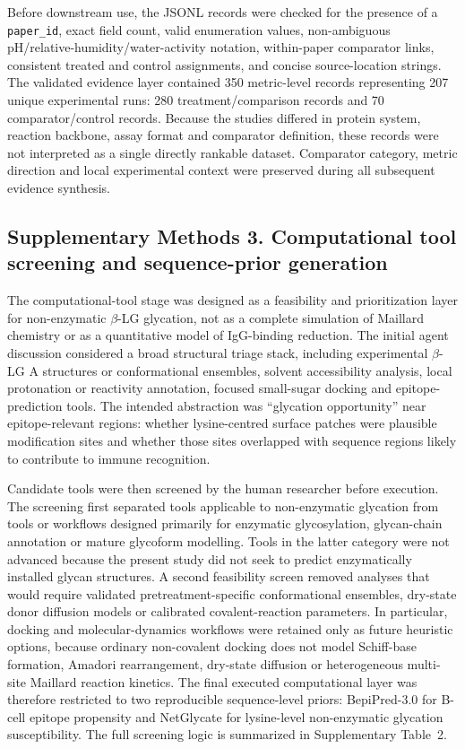 Before downstream use, the JSONL records were checked for the presence of a
\texttt{paper\_id}, exact field count, valid enumeration values, non-ambiguous
pH/relative-humidity/water-activity notation, within-paper comparator links,
consistent treated and control assignments, and concise source-location strings.
The validated evidence layer contained 350 metric-level records representing 207
unique experimental runs: 280 treatment/comparison records and 70 comparator/control
records. Because the studies differed in protein system, reaction backbone,
assay format and comparator definition, these records were not interpreted as a
single directly rankable dataset. Comparator category, metric direction and local
experimental context were preserved during all subsequent evidence synthesis.

\subsection*{Supplementary Methods 3. Computational tool screening and sequence-prior generation}

The computational-tool stage was designed as a feasibility and prioritization
layer for non-enzymatic $\beta$-LG glycation, not as a complete simulation of
Maillard chemistry or as a quantitative model of IgG-binding reduction. The
initial agent discussion considered a broad structural triage stack, including
experimental $\beta$-LG A structures or conformational ensembles, solvent
accessibility analysis, local protonation or reactivity annotation, focused
small-sugar docking and epitope-prediction tools. The intended abstraction was
``glycation opportunity'' near epitope-relevant regions: whether lysine-centred
surface patches were plausible modification sites and whether those sites
overlapped with sequence regions likely to contribute to immune recognition.

Candidate tools were then screened by the human researcher before execution. The
screening first separated tools applicable to non-enzymatic glycation from tools
or workflows designed primarily for enzymatic glycosylation, glycan-chain
annotation or mature glycoform modelling. Tools in the latter category were not
advanced because the present study did not seek to predict enzymatically installed
glycan structures. A second feasibility screen removed analyses that would require
validated pretreatment-specific conformational ensembles, dry-state donor
diffusion models or calibrated covalent-reaction parameters. In particular,
docking and molecular-dynamics workflows were retained only as future heuristic
options, because ordinary non-covalent docking does not model Schiff-base
formation, Amadori rearrangement, dry-state diffusion or heterogeneous multi-site
Maillard reaction kinetics. The final executed computational layer was therefore
restricted to two reproducible sequence-level priors: BepiPred-3.0 for B-cell
epitope propensity and NetGlycate for lysine-level non-enzymatic glycation
susceptibility. The full screening logic is summarized in Supplementary Table~2.

